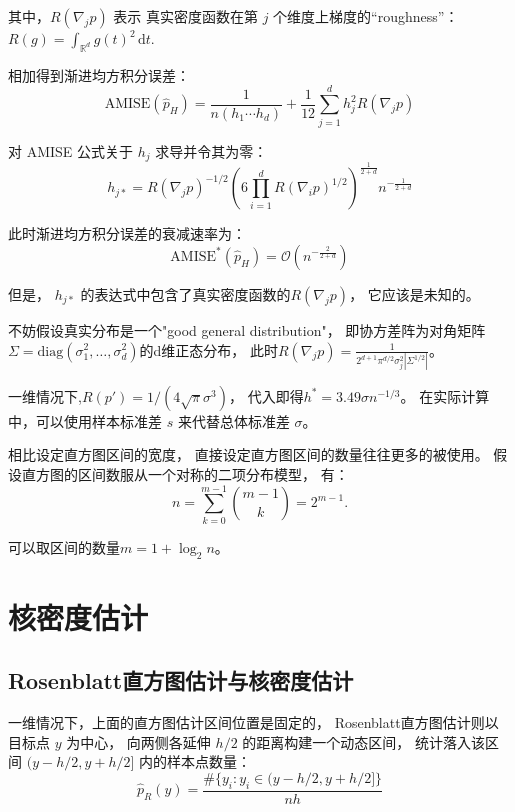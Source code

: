 \documentclass[UTF8]{ctexart}
\begin{document}
其中，$R(\nabla_j p)$ 表示
真实密度函数在第 $j$ 个维度上梯度的“roughness”：$R(g) = \int_{\mathbb{R}^d} g(t)^2 \, \mathrm{d}t$.

相加得到渐进均方积分误差：
\begin{equation}
\text{AMISE}(\hat{p}_H) = \frac{1}{n(h_1 \cdots h_d)} + \frac{1}{12} \sum_{j=1}^d h_j^2 R(\nabla_j p)
\end{equation}

对 AMISE 公式关于 $h_j$ 求导并令其为零：
\begin{equation}
    h_{j*} = R(\nabla_j p)^{-1/2} \left( 6 \prod_{i=1}^d R(\nabla_i p)^{1/2} \right)^{\frac{1}{2+d}} n^{-\frac{1}{2+d}}
\end{equation}

此时渐进均方积分误差的衰减速率为：
\begin{equation}
\text{AMISE}^*(\hat{p}_H) = \mathcal{O}\left(n^{-\frac{2}{2+d}}\right)
\end{equation}

但是，
$h_{j*}$ 的表达式中包含了真实密度函数的$R(\nabla_j p)$，
它应该是未知的。

不妨假设真实分布是一个"good general distribution"，
即协方差阵为对角矩阵$\Sigma = \text{diag}(\sigma_1^2, \dots, \sigma_d^2)$的d维正态分布，
此时$R(\nabla_j p) = \frac{1}{2^{d+1} \pi^{d/2} \sigma_j^2 \left|\Sigma^{1/2}\right|}$。


一维情况下,$R(p') = 1/(4\sqrt{\pi}\sigma^3)$，
代入即得$h^* = 3.49 \sigma n^{-1/3}$。
在实际计算中，可以使用样本标准差 $s$ 来代替总体标准差 $\sigma$。

相比设定直方图区间的宽度，
直接设定直方图区间的数量往往更多的被使用。
假设直方图的区间数服从一个对称的二项分布模型，
有：
\begin{equation}
    n = \sum_{k=0}^{m-1} \binom{m-1}{k}  = 2^{m-1}.
\end{equation}

可以取区间的数量$m = 1 + \log_2 n$。

\section{核密度估计}

\subsection{Rosenblatt直方图估计与核密度估计}

一维情况下，上面的直方图估计区间位置是固定的，
Rosenblatt直方图估计则以目标点 $y$ 为中心，
向两侧各延伸 $h/2$ 的距离构建一个动态区间，
统计落入该区间 $(y - h/2, y + h/2]$ 内的样本点数量：
\begin{equation}
\hat{p}_R(y) = \frac{\#\{y_i : y_i \in (y - h/2, y + h/2]\}}{nh}
\end{equation}
\end{document}
